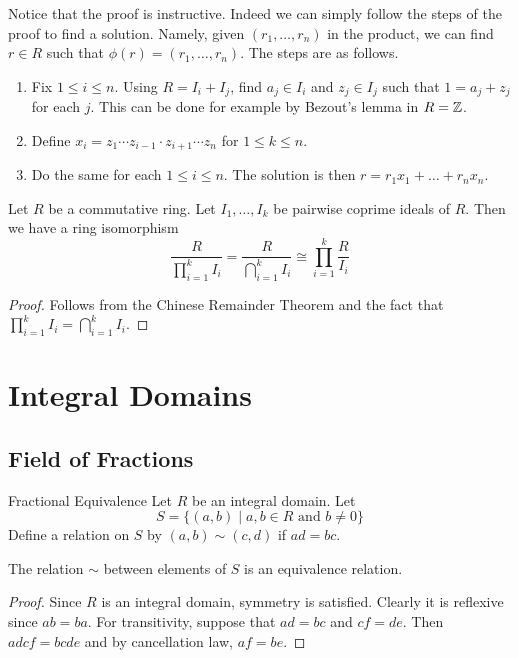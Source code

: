 \documentclass[a4paper]{article}
\begin{document}
Notice that the proof is instructive. Indeed we can simply follow the steps of the proof to find a solution. Namely, given $(r_1,\dots,r_n)$ in the product, we can find $r\in R$ such that $\phi(r)=(r_1,\dots,r_n)$. The steps are as follows. 
\begin{enumerate}
\item Fix $1\leq i\leq n$. Using $R=I_i+I_j$, find $a_j\in I_i$ and $z_j\in I_j$ such that $1=a_j+z_j$ for each $j$. This can be done for example by Bezout's lemma in $R=\mathbb{Z}$. 
\item Define $x_i=z_1\cdots z_{i-1}\cdot z_{i+1}\cdots z_n$ for $1\leq k\leq n$. 
\item Do the same for each $1\leq i\leq n$. The solution is then $r=r_1x_1+\dots+r_nx_n$. 
\end{enumerate}

\begin{crl}{}{} Let $R$ be a commutative ring. Let $I_1,\dots,I_k$ be pairwise coprime ideals of $R$. Then we have a ring isomorphism $$\frac{R}{\prod_{i=1}^kI_i}=\frac{R}{\bigcap_{i=1}^kI_i}\cong\prod_{i=1}^k\frac{R}{I_i}$$ 
\begin{proof}
Follows from the Chinese Remainder Theorem and the fact that $\prod_{i=1}^kI_i=\bigcap_{i=1}^kI_i$. 
\end{proof}
\end{crl}

\pagebreak
\section{Integral Domains}
\subsection{Field of Fractions}
\begin{defn}{Fractional Equivalence}{} Let $R$ be an integral domain. Let $$S=\{(a,b)\;|\;a,b\in R\text{ and }b\neq 0\}$$ Define a relation on $S$ by $(a,b)\sim(c,d)$ if $ad=bc$. 
\end{defn}

\begin{lmm}{}{} The relation $\sim$ between elements of $S$ is an equivalence relation. 
\begin{proof}
Since $R$ is an integral domain, symmetry is satisfied. Clearly it is reflexive since $ab=ba$. For transitivity, suppose that $ad=bc$ and $cf=de$. Then $adcf=bcde$ and by cancellation law, $af=be$. 
\end{proof}
\end{lmm}
\end{document}
